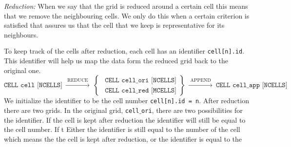 \documentclass[]{article}
\begin{document}
\emph{Reduction:} When we say that the grid is reduced around a certain cell this means that we remove the neighbouring cells. We only do this when a certain criterion is satisfied that assures us that the cell that we keep is representative for its neighbours.

\bigskip

To keep track of the cells after reduction, each cell has an identifier \texttt{cell[n].id}. This identifier will help us map the data form the reduced grid back to the original one.
\begin{equation*}
  \texttt{CELL cell [NCELLS]}
  \ \xrightarrow{\text{ REDUCE }} \ \left.
  \begin{cases}
    \ \ \texttt{CELL cell$\_$ori [NCELLS]} \\
    \ \ \texttt{CELL cell$\_$red [MCELLS]}
  \end{cases}
  \right\} \ \xrightarrow{\text{ APPEND }} \
  \texttt{CELL cell$\_$app [NCELLS]}
\end{equation*}
We initialize the identifier to be the cell number \texttt{cell[n].id = n}. After reduction there are two grids. In the original grid, \texttt{cell$\_$ori}, there are two possibilities for the identifier. If the cell is kept after reduction the identifier will still be equal to the cell number. If t Either the identifier is still equal to the number of the cell which means the the cell is kept after reduction, or the identifier is equal to the



\end{document}
